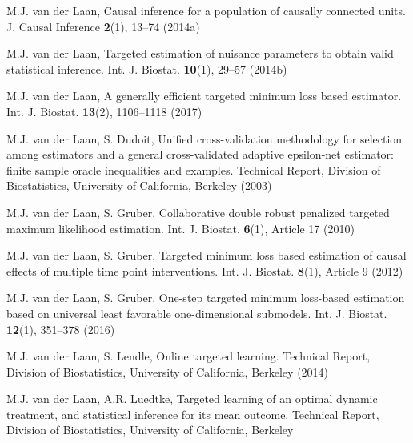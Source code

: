 \begin{list}{}{\setlength{\leftmargin}{2.1em}\setlength{\labelwidth}{0pt}
  \setlength{\labelsep}{0pt}\setlength{\itemindent}{-2.1em}
  \setlength{\parsep}{0pt}\setlength{\itemsep}{2pt}\setlength{\topsep}{0pt}}
\item\label{refentry:REF416}M.J. van der Laan, Causal inference for a population of causally connected units. J. Causal Inference \textbf{2}(1), 13--74 (2014a)\label{refend:REF416}
\item\label{refentry:REF417}M.J. van der Laan, Targeted estimation of nuisance parameters to obtain valid statistical inference. Int. J. Biostat. \textbf{10}(1), 29--57 (2014b)\label{refend:REF417}
\item\label{refentry:REF418}M.J. van der Laan, A generally efficient targeted minimum loss based estimator. Int. J. Biostat. \textbf{13}(2), 1106--1118 (2017)\label{refend:REF418}
\item\label{refentry:REF419}M.J. van der Laan, S. Dudoit, Unified cross-validation methodology for selection among estimators and a general cross-validated adaptive epsilon-net estimator: finite sample oracle inequalities and examples. Technical Report, Division of Biostatistics, University of California, Berkeley (2003)\label{refend:REF419}
\item\label{refentry:REF420}M.J. van der Laan, S. Gruber, Collaborative double robust penalized targeted maximum likelihood estimation. Int. J. Biostat. \textbf{6}(1), Article 17 (2010)\label{refend:REF420}
\item\label{refentry:REF421}M.J. van der Laan, S. Gruber, Targeted minimum loss based estimation of causal effects of multiple time point interventions. Int. J. Biostat. \textbf{8}(1), Article 9 (2012)\label{refend:REF421}
\item\label{refentry:REF422}M.J. van der Laan, S. Gruber, One-step targeted minimum loss-based estimation based on universal least favorable one-dimensional submodels. Int. J. Biostat. \textbf{12}(1), 351--378 (2016)\label{refend:REF422}
\item\label{refentry:REF423}M.J. van der Laan, S. Lendle, Online targeted learning. Technical Report, Division of Biostatistics, University of California, Berkeley (2014)\label{refend:REF423}
\item\label{refentry:REF424}M.J. van der Laan, A.R. Luedtke, Targeted learning of an optimal dynamic treatment, and statistical inference for its mean outcome. Technical Report, Division of Biostatistics, University of California, Berkeley\label{refend:REF424}

\end{list}
